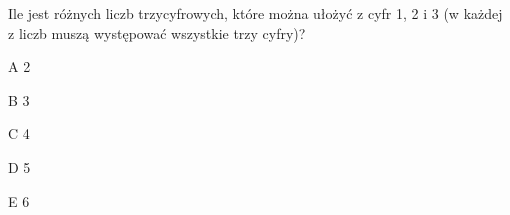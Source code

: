 \begin{tresc}
Ile jest różnych liczb trzycyfrowych, które można ułożyć z cyfr 1, 2 i 3 (w każdej z liczb muszą występować wszystkie trzy cyfry)?
\end{tresc}
\begin{wariant}{A} 2 \end{wariant}
\begin{wariant}{B} 3 \end{wariant}
\begin{wariant}{C} 4 \end{wariant}
\begin{wariant}{D} 5 \end{wariant}
\begin{wariant}{E} 6 \end{wariant}
